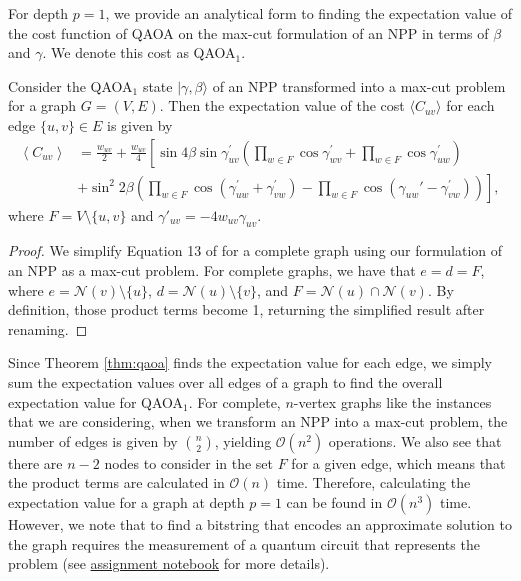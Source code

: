     For depth $p=1$, we provide an analytical form to finding the expectation value of the cost function of QAOA on the max-cut formulation of an NPP in terms of $\beta$ and $\gamma$. We denote this cost as QAOA$_1$.
    \begin{widetext}
        \begin{theorem} \label{thm:qaoa}
            Consider the QAOA$_1$ state $|\gamma,\beta\rangle$ of an NPP transformed into a max-cut problem for a graph $G=(V,E)$. Then the expectation value of the cost $\langle C_{uv}\rangle$ for each edge $\{u,v\}\in E$ is given by
            \begin{align*}
                \left\langle C_{u v}\right\rangle & =\frac{w_{u v}}{2}+\frac{w_{u v}}{4}\left[\sin 4 \beta \sin \gamma_{u v}^{\prime}\left(\prod_{w \in F} \cos \gamma_{w v}^{\prime}+\prod_{w \in F} \cos \gamma_{u w}^{\prime}\right)\right. \\ 
                & \left.+\sin ^2 2 \beta \left(\prod_{w \in F} \cos \left(\gamma_{u w}^{\prime}+\gamma_{v w}^{\prime}\right)-\prod_{w \in F} \cos \left(\gamma_{u w}'-\gamma_{v w}^{\prime}\right)\right)\right],
            \end{align*}
            where $F = V\setminus\{u,v\}$ and $\gamma'_{uv} = -4w_{uv}\gamma_{uv}$.
        \end{theorem}
    \end{widetext}
        \begin{proof}
            We simplify Equation 13 of \cite{vijendran2023expressive} for a complete graph using our formulation of an NPP as a max-cut problem. For complete graphs, we have that $e=d=F$, where $e=\mathcal{N}(v)\setminus\{u\}$, $d=\mathcal{N}(u)\setminus\{v\}$, and $F=\mathcal{N}(u)\cap\mathcal{N}(v)$. By definition, those product terms become 1, returning the simplified result after renaming.
        \end{proof}
        Since Theorem \ref{thm:qaoa} finds the expectation value for each edge, we simply sum the expectation values over all edges of a graph to find the overall expectation value for QAOA$_1$. For complete, $n$-vertex graphs like the instances that we are considering, when we transform an NPP into a max-cut problem, the number of edges is given by $\binom{n}{2}$, yielding $\mathcal{O}(n^2)$ operations. We also see that there are $n-2$ nodes to consider in the set $F$ for a given edge, which means that the product terms are calculated in $\mathcal{O}(n)$ time. Therefore, calculating the expectation value for a graph at depth $p=1$ can be found in $\mathcal{O}(n^3)$ time. However, we note that to find a bitstring that encodes an approximate solution to the graph requires the measurement of a quantum circuit that represents the problem (see \href{https://github.com/yangdabei/quantum-number-partitioning/blob/main/assignment-files/qaoa-maxcut/QAOA%20Practice%20Questions.ipynb}{assignment notebook} for more details).

